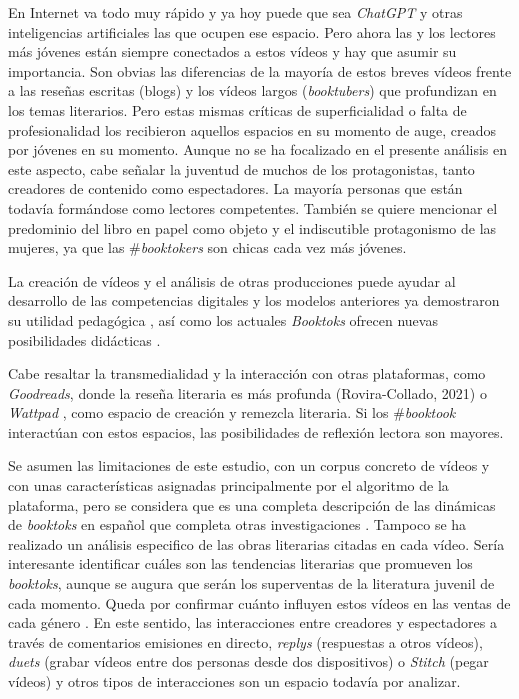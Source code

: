 En Internet va todo muy rápido y ya hoy puede que sea \emph{ChatGPT} y
otras inteligencias artificiales las que ocupen ese espacio. Pero ahora
las y los lectores más jóvenes están siempre conectados a estos vídeos y
hay que asumir su importancia. Son obvias las diferencias de la mayoría
de estos breves vídeos frente a las reseñas escritas (blogs) y los
vídeos largos (\emph{booktubers}) que profundizan en los temas
literarios. Pero estas mismas críticas de superficialidad o falta de
profesionalidad los recibieron aquellos espacios en su momento de auge,
creados por jóvenes en su momento. Aunque no se ha focalizado en el
presente análisis en este aspecto, cabe señalar la juventud de muchos de
los protagonistas, tanto creadores de contenido como espectadores. La
mayoría personas que están todavía formándose como lectores competentes.
También se quiere mencionar el predominio del libro en papel como objeto
y el indiscutible protagonismo de las mujeres, ya que las
\#\emph{booktokers} son chicas cada vez más jóvenes.

La creación de vídeos y el análisis de otras producciones puede ayudar
al desarrollo de las competencias digitales \cite{allué2023} y los
modelos anteriores ya demostraron su utilidad pedagógica \cite{paladines_Paredes_Aliagas_Marín_2021}, así como los actuales \emph{Booktoks} ofrecen nuevas
posibilidades didácticas \cite{dezuanni2021,acevedo2022}.

Cabe resaltar la transmedialidad y la interacción con otras plataformas,
como \emph{Goodreads}, donde la reseña literaria es más profunda
\cite{roviracollado2021}(Rovira-Collado, 2021) o \emph{Wattpad} \cite{garciaroca2019},
como espacio de creación y remezcla literaria. Si los \#\emph{booktook}
interactúan con estos espacios, las posibilidades de reflexión lectora
son mayores.

Se asumen las limitaciones de este estudio, con un corpus concreto de
vídeos y con unas características asignadas principalmente por el
algoritmo de la plataforma, pero se considera que es una completa
descripción de las dinámicas de \emph{booktoks} en español que completa
otras investigaciones \cite{guinez-cabara2022}. Tampoco
se ha realizado un análisis especifico de las obras literarias citadas
en cada vídeo. Sería interesante identificar cuáles son las tendencias
literarias que promueven los \emph{booktoks}, aunque se augura que serán
los superventas de la literatura juvenil de cada momento. Queda por
confirmar cuánto influyen estos vídeos en las ventas de cada género
\cite{merga2021,martens2022}. En este sentido, las
interacciones entre creadores y espectadores a través de comentarios
emisiones en directo, \emph{replys} (respuestas a otros vídeos),
\emph{duets} (grabar vídeos entre dos personas desde dos dispositivos) o
\emph{Stitch} (pegar vídeos) y otros tipos de interacciones son un
espacio todavía por analizar.

